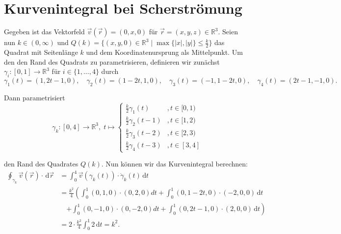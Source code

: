 \documentclass[11pt]{article}
\theoremstyle{plain}
\theoremstyle{definition}
\theoremstyle{remark}
\newcommand{\R}{\mathbb{R}}
\renewcommand{\d}{\,\mathrm{d}}
\newcommand{\longto}{\longrightarrow}
\begin{document}
\begin{center}
\end{center}

\section{Kurvenintegral bei Scherströmung}
Gegeben ist das Vektorfeld $\vec v(\vec r) = (0, x, 0)$ für $\vec r = (x,y,z) \in \R^3$. Seien nun $k \in (0, \infty)$ und $Q(k) = \{ (x,y,0) \in \R^3 \mid \max \{ |x|,|y| \} \leq \frac{k}{2} \}$ das Quadrat mit Seitenlänge $k$ und dem Koordinatenursprung als Mittelpunkt. Um den den Rand des Quadrats zu parametrisieren, definieren wir zunächst $\gamma_i : [0,1] \longto \R^3$ für $i \in \{1,\dots, 4\}$ durch
\[ \gamma_1 (t) = (1, 2t-1, 0), \quad \gamma_2 (t) = (1-2t, 1, 0), \quad \gamma_3 (t) = (-1, 1-2t, 0), \quad \gamma_4 (t) = (2t-1, -1, 0). \]

Dann parametrisiert
\[ \gamma_k: [0,4] \longto \R^3,\; t \longmapsto \begin{cases}
\tfrac{k}{2}\gamma_1(t) &, t \in [0,1)\\
\tfrac{k}{2}\gamma_2(t-1) &, t \in [1,2)\\
\tfrac{k}{2}\gamma_3(t-2) &, t \in [2,3)\\
\tfrac{k}{2}\gamma_4(t-3) &, t \in [3,4]
\end{cases} \]

den Rand des Quadrates $Q(k)$. Nun können wir das Kurvenintegral berechnen:
\begin{align*}
\oint_{\gamma_k} \vec v(\vec r)\cdot \d\vec r &= \int_0^4 \vec v(\gamma_k(t)) \cdot \dot \gamma_k (t) \d t \\
&= \frac{k^2}{4} \left( \int_0^1 (0,1,0) \cdot (0,2,0) dt + \int_0^1 (0, 1-2t, 0) \cdot (-2,0,0) \d t \right.\\
&\quad \left. + \int_0^1 (0,-1,0) \cdot (0,-2,0) dt + \int_0^1 (0, 2t-1, 0) \cdot (2,0,0) \d t \right)\\
&= 2\cdot\frac{k^2}{4} \int_0^1 2 \d t = k^2.
\end{align*}
\end{document}
